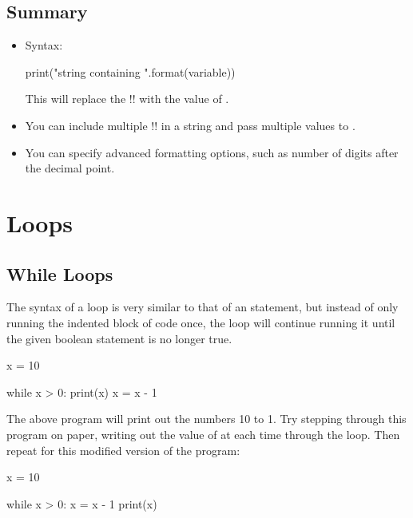 \documentclass[11pt]{cselabheader}
\begin{document}
\subsection{Summary}

\begin{itemize}
  \item Syntax:
    \begin{python3code}
print("string containing {}".format(variable))
    \end{python3code}
    
    This will replace the \pythoninline!{}! with the value of .
    
  \item You can include multiple \pythoninline!{}! in a string and pass multiple values to .

  \item You can specify advanced formatting options, such as number of digits after the decimal point.
\end{itemize}

\pagebreak
\section{Loops}

\subsection{While Loops}
The syntax of a  loop is very similar to that of an
 statement, but instead of only running the indented block of code
once, the  loop will continue running it until the given
boolean statement is no longer true.

\begin{python3code}
x = 10

while x > 0:
    print(x)
    x = x - 1
\end{python3code}

The above program will print out the numbers 10 to 1. Try stepping through this
program on paper, writing out the value of  at each time through
the loop. Then repeat for this modified version of the program:

\begin{python3code}
x = 10

while x > 0:
    x = x - 1
    print(x)
\end{python3code}
\end{document}
